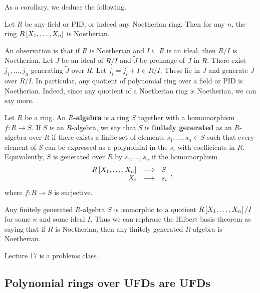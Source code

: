 \pagebreak

As a corollary, we deduce the following.

\begin{corollary}
Let $ R $ be any field or PID, or indeed any Noetherian ring. Then for any $ n $, the ring $ R\sbr{X_1, \dots, X_n} $ is Noetherian.
\end{corollary}

An observation is that if $ R $ is Noetherian and $ I \subseteq R $ is an ideal, then $ R / I $ is Noetherian. Let $ J $ be an ideal of $ R / I $ and $ \widetilde{J} $ be preimage of $ J $ in $ R $. There exist $ \widetilde{j_1}, \dots, \widetilde{j_n} $ generating $ \widetilde{J} $ over $ R $. Let $ j_i = \widetilde{j_i} + I \in R / I $. These lie in $ J $ and generate $ J $ over $ R / I $. In particular, any quotient of polynomial ring over a field or PID is Noetherian. Indeed, since any quotient of a Noetherian ring is Noetherian, we can say more.

\begin{definition}
Let $ R $ be a ring. An \textbf{$ R $-algebra} is a ring $ S $ together with a homomorphism $ f : R \to S $. If $ S $ is an $ R $-algebra, we say that $ S $ is \textbf{finitely generated} as an $ R $-algebra over $ R $ if there exists a finite set of elements $ s_1, \dots, s_n \in S $ such that every element of $ S $ can be expressed as a polynomial in the $ s_i $ with coefficients in $ R $. Equivalently, $ S $ is generated over $ R $ by $ s_1, \dots, s_n $ if the homomorphism
$$ \function{R\sbr{X_1, \dots, X_n}}{S}{X_i}{s_i}, $$
where $ f : R \to S $ is surjective.
\end{definition}

\begin{note*}
Any finitely generated $ R $-algebra $ S $ is isomorphic to a quotient $ R\sbr{X_1, \dots, X_n} / I $ for some $ n $ and some ideal $ I $. Thus we can rephrase the Hilbert basis theorem as saying that if $ R $ is Noetherian, then any finitely generated $ R $-algebra is Noetherian.
\end{note*}


Lecture 17 is a problems class.

\subsection{Polynomial rings over UFDs are UFDs}


